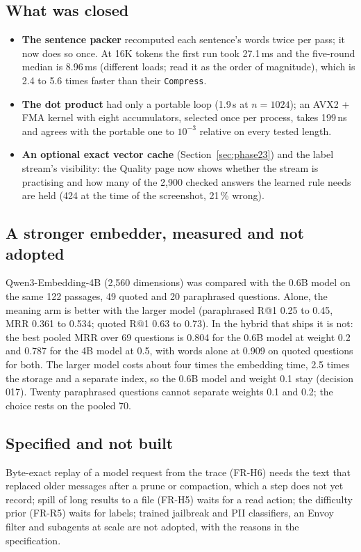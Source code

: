 \subsection{What was closed}

\begin{itemize}
\item \textbf{The sentence packer} recomputed each sentence's words twice per pass; it now does so once. At 16K tokens the first run took 27.1\,ms and the five-round
  median is 8.96\,ms (different loads; read it as the order of magnitude), which is 2.4 to 5.6 times faster than their \texttt{Compress}.
\item \textbf{The dot product} had only a portable loop (1.9\,\textmu s at $n=1024$); an AVX2 + FMA kernel with eight accumulators, selected once per process, takes
  199\,ns and agrees with the portable one to $10^{-3}$ relative on every tested length.
\item \textbf{An optional exact vector cache} (Section~\ref{sec:phase23}) and the label stream's visibility: the Quality page now shows whether the stream is
  practising and how many of the 2,900 checked answers the learned rule needs are held (424 at the time of the screenshot, 21\,\% wrong).
\end{itemize}

\subsection{A stronger embedder, measured and not adopted}

Qwen3-Embedding-4B (2,560 dimensions) was compared with the 0.6B model on the same 122 passages, 49 quoted and 20 paraphrased questions. Alone, the meaning arm is
better with the larger model (paraphrased R@1 0.25 to 0.45, MRR 0.361 to 0.534; quoted R@1 0.63 to 0.73). In the hybrid that ships it is not: the best pooled MRR over 69
questions is 0.804 for the 0.6B model at weight 0.2 and 0.787 for the 4B model at 0.5, with words alone at 0.909 on quoted questions for both. The larger model costs
about four times the embedding time, 2.5 times the storage and a separate index, so the 0.6B model and weight 0.1 stay (decision 017). Twenty paraphrased
questions cannot separate weights 0.1 and 0.2; the choice rests on the pooled 70.

\subsection{Specified and not built}

Byte-exact replay of a model request from the trace (FR-H6) needs the text that replaced older messages after a prune or compaction, which a step does not yet record;
spill of long results to a file (FR-H5) waits for a read action; the difficulty prior (FR-R5) waits for labels; trained jailbreak and PII classifiers, an Envoy filter and
subagents at scale are not adopted, with the reasons in the specification.
